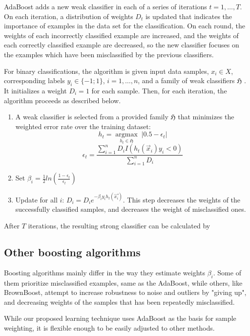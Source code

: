 AdaBoost adds a new weak classifier in each of a series of iterations  $t = 1,\ldots,T$. On each iteration, a distribution of weights $D_{t}$ is updated that indicates the importance of examples in the data set for the classification. On each round, the weights of each incorrectly classified example are increased, and the weights of each correctly classified example are decreased, so the new classifier focuses on the examples which have been misclassified by the previous classifiers.

	For binary classifications, the algorithm is given input data samples, $x_i \in X$,  corresponding labels $y_i\in \{-1;1\}$, $i = 1,\ldots,n$, and a family of weak classifiers $\mathfrak{H}$ .  It initializes a weight $D_i=1$ for each sample. Then, for each iteration, the algorithm proceeds as described below.
\begin{enumerate}
\item {A weak classifier is selected from a provided family  $\mathfrak{H}$ that minimizes the weighted error rate over the training dataset:
$$
    h_{t} =\underset{h_{t} \in \mathfrak{H}}{\operatorname{argmax}}  \; \left| 0.5 - \epsilon_{t}\right|
$$}
$$
\epsilon_{t}=\frac{\sum_{i=1}^{n}D_i I(h_t(\vec{x}_i)y_i<0)}{\sum_{i=1}^{n}D_i}
$$
\item {Set $\beta_i=\frac{1}{2}ln\left(\frac{1-\epsilon_{t}}{\epsilon_{t}}\right)$}
\item{Update for all $i$: $D_i=D_i e^{-\beta_i y_i h_t(\vec{x_i})}$. This step decreases the weights of the successfully classified samples, and decreases the weight of misclassified ones. }
\end{enumerate}

After $T$ iterations, the resulting strong classifier can be calculated by 

\subsection{Other boosting algorithms}
Boosting algorithms mainly differ in the way they estimate weights $\beta_i$. Some of them prioritize misclassified examples, same as the AdaBoost, while others, like BrownBoost, attempt to increase robustness to noise and outliers by "giving up", and decreasing weights of the samples that has been repeatedly misclassified. 

While our proposed learning technique uses AdaBoost as the basis for sample weighting, it is flexible enough to be easily adjusted to other methods. 


